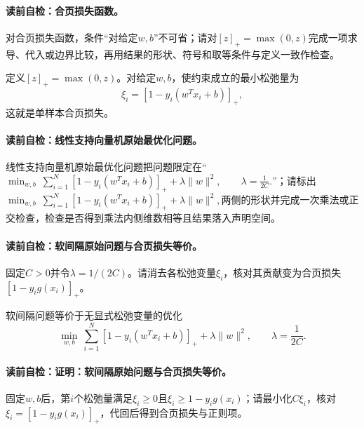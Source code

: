 \paragraph{读前自检：合页损失函数。}对合页损失函数，条件“对给定$w,b$”不可省；请对$[z]_+=\max(0,z)$完成一项求导、代入或边界比较，再用结果的形状、符号和取等条件与定义一致作检查。\par

定义$[z]_+=\max(0,z)$。对给定$w,b$，使约束成立的最小松弛量为
\[
\xi_i=[1-y_i(w^Tx_i+b)]_+,
\]
这就是单样本合页损失。

\paragraph{读前自检：线性支持向量机原始最优化问题。}线性支持向量机原始最优化问题把问题限定在“$\min_{w,b}\ \sum_{i=1}^{N}[1-y_i(w^Tx_i+b)]_+ +\lambda\lVert w\rVert^2,\qquad \lambda=\frac{1}{2C}.$”；请标出$\min_{w,b}\ \sum_{i=1}^{N}[1-y_i(w^Tx_i+b)]_+ +\lambda\lVert w\rVert^2,$两侧的形状并完成一次乘法或正交检查，检查是否得到乘法内侧维数相等且结果落入声明空间。\par

\paragraph{读前自检：软间隔原始问题与合页损失等价。}固定$C>0$并令$\lambda=1/(2C)$。请消去各松弛变量$\xi_i$，核对其贡献变为合页损失$[1-y_ig(x_i)]_+$。\par

\begin{theorem}[软间隔原始问题与合页损失等价]\label{thm:V3-C02-hinge-equivalence}
软间隔问题等价于无显式松弛变量的优化
\[
\min_{w,b}\ \sum_{i=1}^{N}[1-y_i(w^Tx_i+b)]_+
+\lambda\lVert w\rVert^2,\qquad \lambda=\frac{1}{2C}.
\]
\end{theorem}
\paragraph{读前自检：证明：软间隔原始问题与合页损失等价。}固定$w,b$后，第$i$个松弛量满足$\xi_i\ge0$且$\xi_i\ge1-y_ig(x_i)$；请最小化$C\xi_i$，核对$\xi_i=[1-y_ig(x_i)]_+$，代回后得到合页损失与正则项。\par

